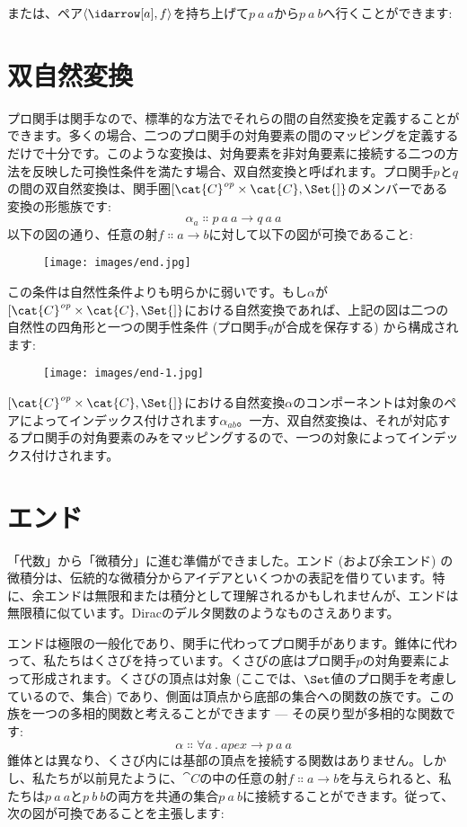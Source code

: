 または、ペア$\langle \idarrow[a], f \rangle$を持ち上げて$p\ a\ a$から$p\ a\ b$へ行くことができます: 


\section{双自然変換}

プロ関手は関手なので、標準的な方法でそれらの間の自然変換を定義することができます。多くの場合、二つのプロ関手の対角要素の間のマッピングを定義するだけで十分です。このような変換は、対角要素を非対角要素に接続する二つの方法を反映した可換性条件を満たす場合、双自然変換と呼ばれます。プロ関手$p$と$q$の間の双自然変換は、関手圏${[}\cat{C}^\mathit{op}\times{}\cat{C}, \Set{]}$のメンバーである変換の形態族です: 
\[\alpha_a \Colon p\ a\ a \to q\ a\ a\]
以下の図の通り、任意の射$f \Colon a \to b$に対して以下の図が可換であること: 

\begin{figure}[H]
  \centering
  \texttt{[image: images/end.jpg]}
\end{figure}

\noindent
この条件は自然性条件よりも明らかに弱いです。もし$\alpha$が${[}\cat{C}^\mathit{op}\times{}\cat{C}, \Set{]}$における自然変換であれば、上記の図は二つの自然性の四角形と一つの関手性条件 (プロ関手$q$が合成を保存する) から構成されます: 

\begin{figure}[H]
  \centering
  \texttt{[image: images/end-1.jpg]}
\end{figure}

\noindent
${[}\cat{C}^\mathit{op}\times{}\cat{C}, \Set{]}$における自然変換$\alpha$のコンポーネントは対象のペアによってインデックス付けされます$\alpha_{a b}$。一方、双自然変換は、それが対応するプロ関手の対角要素のみをマッピングするので、一つの対象によってインデックス付けされます。

\section{エンド}

「代数」から「微積分」に進む準備ができました。エンド (および余エンド) の微積分は、伝統的な微積分からアイデアといくつかの表記を借りています。特に、余エンドは無限和または積分として理解されるかもしれませんが、エンドは無限積に似ています。Diracのデルタ関数のようなものさえあります。

エンドは極限の一般化であり、関手に代わってプロ関手があります。錐体に代わって、私たちはくさびを持っています。くさびの底はプロ関手$p$の対角要素によって形成されます。くさびの頂点は対象 (ここでは、$\Set$値のプロ関手を考慮しているので、集合) であり、側面は頂点から底部の集合への関数の族です。この族を一つの多相的関数と考えることができます --- その戻り型が多相的な関数です: 
\[\alpha \Colon \forall a\ .\ \mathit{apex} \to p\ a\ a\]
錐体とは異なり、くさび内には基部の頂点を接続する関数はありません。しかし、私たちが以前見たように、$\cat{C}$の中の任意の射$f \Colon a \to b$を与えられると、私たちは$p\ a\ a$と$p\ b\ b$の両方を共通の集合$p\ a\ b$に接続することができます。従って、次の図が可換であることを主張します: 

